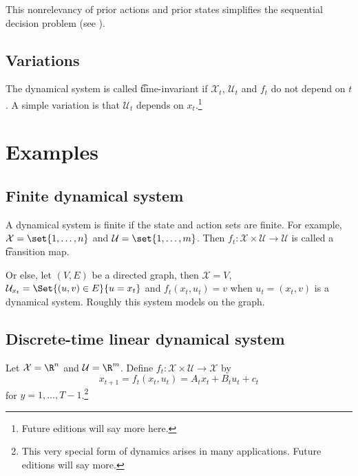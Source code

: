 This nonrelevancy of prior actions and prior states simplifies the sequential decision problem (see ).

\subsection*{Variations}

The dynamical system is called \t{time-invariant} if $\mathcal{X} _{t}$, $\mathcal{U} _t$ and $f_t$ do not depend on $t$.
A simple variation is that $\mathcal{U} _t$ depends on $x_t$.\footnote{Future editions will say more here.}

\section*{Examples}

\subsection*{Finite dynamical system}

A dynamical system is finite if the state and action sets are finite.
For example, $\mathcal{X}  = \set{1, \dots , n}$ and $\mathcal{U}  = \set{1, \dots , m}$.
Then $f_t: \mathcal{X}  \times  \mathcal{U}  \to \mathcal{U} $ is called a \t{transition map}.

Or else, let $(V, E)$ be a directed graph, then $\mathcal{X} = V$, $\mathcal{U} _{x_t} = \Set{(u, v) \in E}{u = x_t}$ and $f_t(x_t, u_t) = v$ when $u_t = (x_t, v)$ is a dynamical system.
Roughly this system models  on the graph.

\subsection*{Discrete-time linear dynamical system}

Let $\mathcal{X}  = \R ^n$ and $\mathcal{U}  = \R ^m$.
Define $f_t: \mathcal{X}  \times  \mathcal{U}  \to \mathcal{X} $ by
    \[
x_{t+1} = f_t(x_t, u_t) = A_t x_t + B_t u_t + c_t
    \]
for $y = 1, \dots , T-1$.\footnote{This very special form of dynamics arises in many applications. Future editions will say more.}
